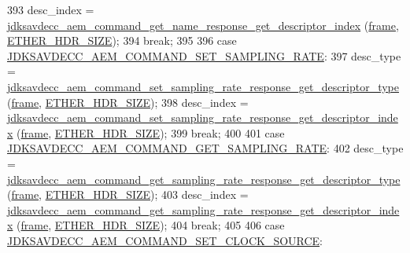\begin{DoxyCode}
393         desc\_index = 
      \hyperlink{group__command__get__name__response_gace444f9fe92f80bf52c6d3d9199e7b38}{jdksavdecc\_aem\_command\_get\_name\_response\_get\_descriptor\_index}
      (\hyperlink{gst__avb__playbin_8c_ac8e710e0b5e994c0545d75d69868c6f0}{frame}, \hyperlink{namespaceavdecc__lib_a6c827b1a0d973e18119c5e3da518e65ca9512ad9b34302ba7048d88197e0a2dc0}{ETHER\_HDR\_SIZE});
394         \textcolor{keywordflow}{break};
395 
396     \textcolor{keywordflow}{case} \hyperlink{group__command_ga65253366a1e39d922ec9e1ef07ff6af7}{JDKSAVDECC\_AEM\_COMMAND\_SET\_SAMPLING\_RATE}:
397         desc\_type = 
      \hyperlink{group__command__set__sampling__rate__response_ga7ef41da0b00b554d79a79560a39212c5}{jdksavdecc\_aem\_command\_set\_sampling\_rate\_response\_get\_descriptor\_type}
      (\hyperlink{gst__avb__playbin_8c_ac8e710e0b5e994c0545d75d69868c6f0}{frame}, \hyperlink{namespaceavdecc__lib_a6c827b1a0d973e18119c5e3da518e65ca9512ad9b34302ba7048d88197e0a2dc0}{ETHER\_HDR\_SIZE});
398         desc\_index = 
      \hyperlink{group__command__set__sampling__rate__response_ga805bbca5c29f5e4fe9835ab533a32d66}{jdksavdecc\_aem\_command\_set\_sampling\_rate\_response\_get\_descriptor\_index}
      (\hyperlink{gst__avb__playbin_8c_ac8e710e0b5e994c0545d75d69868c6f0}{frame}, \hyperlink{namespaceavdecc__lib_a6c827b1a0d973e18119c5e3da518e65ca9512ad9b34302ba7048d88197e0a2dc0}{ETHER\_HDR\_SIZE});
399         \textcolor{keywordflow}{break};
400 
401     \textcolor{keywordflow}{case} \hyperlink{group__command_ga42a1a73d69e78b1a9b5bbe7f24a85317}{JDKSAVDECC\_AEM\_COMMAND\_GET\_SAMPLING\_RATE}:
402         desc\_type = 
      \hyperlink{group__command__get__sampling__rate__response_gafca42dc2dbc04f4fa5a67d0a77c8c659}{jdksavdecc\_aem\_command\_get\_sampling\_rate\_response\_get\_descriptor\_type}
      (\hyperlink{gst__avb__playbin_8c_ac8e710e0b5e994c0545d75d69868c6f0}{frame}, \hyperlink{namespaceavdecc__lib_a6c827b1a0d973e18119c5e3da518e65ca9512ad9b34302ba7048d88197e0a2dc0}{ETHER\_HDR\_SIZE});
403         desc\_index = 
      \hyperlink{group__command__get__sampling__rate__response_gada7b78ddb76b1d761c6785a28275227d}{jdksavdecc\_aem\_command\_get\_sampling\_rate\_response\_get\_descriptor\_index}
      (\hyperlink{gst__avb__playbin_8c_ac8e710e0b5e994c0545d75d69868c6f0}{frame}, \hyperlink{namespaceavdecc__lib_a6c827b1a0d973e18119c5e3da518e65ca9512ad9b34302ba7048d88197e0a2dc0}{ETHER\_HDR\_SIZE});
404         \textcolor{keywordflow}{break};
405 
406     \textcolor{keywordflow}{case} \hyperlink{group__command_ga058084a4e98b48f84b00c96f56130622}{JDKSAVDECC\_AEM\_COMMAND\_SET\_CLOCK\_SOURCE}:

\end{DoxyCode}
